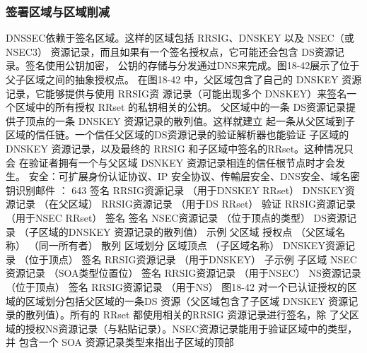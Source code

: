 \subsubsection{签署区域与区域削减}
DNSSEC依赖于签名区域。这样的区域包括 RRSIG、DNSKEY 以及 NSEC（或NSEC3）
资源记录，而且如果有一个签名授权点，它可能还会包含 DS资源记录。签名使用公钥加密，
公钥的存储与分发通过DNS来完成。图18-42展示了位于父子区域之间的抽象授权点。
在图18-42 中，父区域包含了自己的 DNSKEY 资源记录，它能够提供与使用 RRSIG资
源记录（可能出现多个 DNSKEY）来签名一个区域中的所有授权 RRset 的私钥相关的公钥。
父区域中的一条 DS资源记录提供子顶点的一条 DNSKEY 资源记录的散列值。这样就建立
起一条从父区域到子区域的信任链。一个信任父区域的DS资源记录的验证解析器也能验证
子区域的DNSKEY 资源记录，以及最终的 RRSIG 和子区域中签名的RRset。这种情况只会
在验证者拥有一个与父区域 DSNKEY 资源记录相连的信任根节点时才会发生。
安全：可扩展身份认证协议、IP 安全协议、传輸层安全、DNS安全、域名密钥识别邮件
： 643
签名
RRSIG资源记录
（用于DNSKEY RRset）
DNSKEY资源记录
（在父区域）
RRSIG资源记录
（用于DS RRset）
验证
RRSIG资源记录
（用于NSEC RRset）
签名
签名
NSEC资源记录
（位于顶点的类型）
DS资源记录
（子区域的DNSKEY
资源记录的散列值）
示例
父区域
授权点
（父区域名称）
（同一所有者）
散列
区域划分
区域顶点
（子区域名称）
DNSKEY资源记录
（位于顶点）
签名
RRSIG资源记录
（用于DNSKEY）
子示例
子区域
NSEC资源记录
（SOA类型位置位）
签名
RRSIG资源记录
（用于NSEC）
NS资源记录
（位于顶点）
签名
RRSIG资源记录
（用于NS）
图18-42 对一个已认证授权的区域的区域划分包括父区域的一条DS 资源（父区域包含了子区域
DNSKEY 资源记录的散列值）。所有的 RRset 都使用相关的RRSIG 资源记录进行签名，除
了父区域的授权NS资源记录（与粘贴记录）。NSEC资源记录能用于验证区域中的类型，并
包含一个 SOA 资源记录类型来指出子区域的顶部
